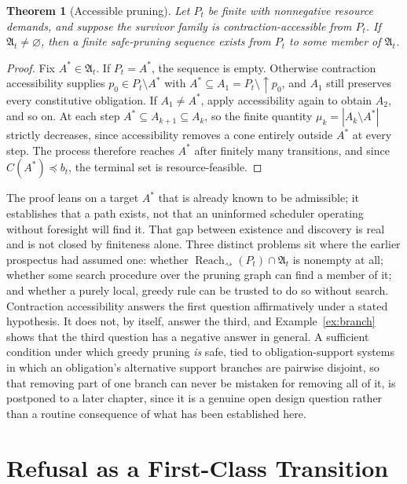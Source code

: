 \documentclass[11pt]{report}
\newtheorem{theorem}[definition]{Theorem}
\begin{document}
\begin{theorem}[Accessible pruning]
Let $P_t$ be finite with nonnegative resource demands, and suppose the survivor family is contraction-accessible from $P_t$. If $\mathfrak A_t \ne \varnothing$, then a finite safe-pruning sequence exists from $P_t$ to some member of $\mathfrak A_t$.
\end{theorem}
\begin{proof}
Fix $A^\ast \in \mathfrak A_t$. If $P_t = A^\ast$, the sequence is empty. Otherwise contraction accessibility supplies $p_0 \in P_t \setminus A^\ast$ with $A^\ast \subseteq A_1 = P_t \setminus \uparrow p_0$, and $A_1$ still preserves every constitutive obligation. If $A_1 \ne A^\ast$, apply accessibility again to obtain $A_2$, and so on. At each step $A^\ast \subseteq A_{k+1} \subseteq A_k$, so the finite quantity $\mu_k = |A_k \setminus A^\ast|$ strictly decreases, since accessibility removes a cone entirely outside $A^\ast$ at every step. The process therefore reaches $A^\ast$ after finitely many transitions, and since $C(A^\ast) \preceq b_t$, the terminal set is resource-feasible.
\end{proof}

The proof leans on a target $A^\ast$ that is already known to be admissible; it establishes that a path exists, not that an uninformed scheduler operating without foresight will find it. That gap between existence and discovery is real and is not closed by finiteness alone. Three distinct problems sit where the earlier prospectus had assumed one: whether $\operatorname{Reach}_\rightsquigarrow(P_t) \cap \mathfrak A_t$ is nonempty at all; whether some search procedure over the pruning graph can find a member of it; and whether a purely local, greedy rule can be trusted to do so without search. Contraction accessibility answers the first question affirmatively under a stated hypothesis. It does not, by itself, answer the third, and Example~\ref{ex:branch} shows that the third question has a negative answer in general. A sufficient condition under which greedy pruning \emph{is} safe, tied to obligation-support systems in which an obligation's alternative support branches are pairwise disjoint, so that removing part of one branch can never be mistaken for removing all of it, is postponed to a later chapter, since it is a genuine open design question rather than a routine consequence of what has been established here.

\chapter{Refusal as a First-Class Transition}
\end{document}
